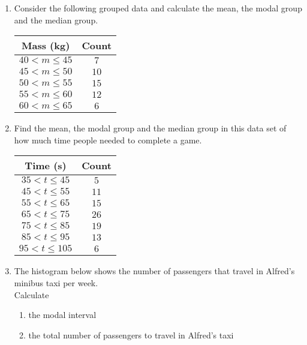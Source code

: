 \begin{exercises}{}{
  \begin{enumerate}[itemsep=8pt, label=\textbf{\arabic*}.]
 \item Consider the following grouped data and calculate the mean,
    the modal group and the median group.
\\
    \begin{center}
      \begin{tabular}{|c|c|}\hline
        \textbf{Mass (kg)} & \textbf{Count} \\\hline
        $40 < m \le 45$ & $7$ \\\hline
        $45 < m \le 50$ & $10$ \\\hline
        $50 < m \le 55$ & $15$ \\\hline
        $55 < m \le 60$ & $12$ \\\hline
        $60 < m \le 65$ & $6$ \\\hline
      \end{tabular}
    \end{center}
\item Find the mean, the modal group and the median group in this
    data set of how much time people needed to complete a game.
\\
    \begin{center}
      \begin{tabular}{|c|c|} \hline
       \textbf{Time (s)} & \textbf{Count} \\ \hline
        $35 < t \le 45$ & $5$ \\\hline
        $45 < t \le 55$ & $11$ \\\hline
        $55 < t \le 65$ & $15$ \\\hline
        $65 < t \le 75$ & $26$ \\\hline
        $75 < t \le 85$ & $19$ \\\hline
        $85 < t \le 95$ & $13$ \\\hline
        $95 < t \le 105$ & $6$ \\\hline
      \end{tabular}
    \end{center}
\item The histogram below shows the number of passengers that travel in Alfred's minibus taxi per week.\\
Calculate
\begin{enumerate}[noitemsep, label=\textbf{(\alph*)} ]
\item the modal interval
\item the total number of passengers to travel in Alfred's taxi

\end{enumerate}
\end{enumerate}}
\end{exercises}
